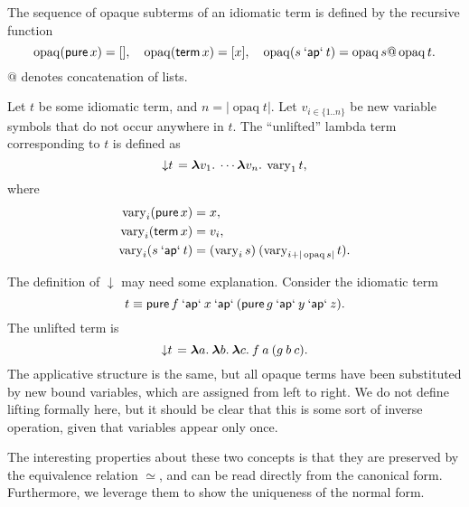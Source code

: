 \begin{definition}\label{def:opaque-seq}
The sequence of opaque subterms of an idiomatic term is defined by the
recursive function
\[
	\operatorname{opaq}(\operatorname{\mathsf{pure}} x) = [], \quad
	\operatorname{opaq}(\operatorname{\mathsf{term}} x) = [x], \quad
	\operatorname{opaq}(s \mathbin{\mathsf{`ap`}} t) = \operatorname{opaq} s @ \operatorname{opaq} t.
\]
$@$ denotes concatenation of lists.
\end{definition}

\begin{definition}[Unlifting]\label{def:unlifting}
Let $t$ be some idiomatic term, and $n = |\operatorname{opaq} t|$.
Let $v_{i \in \{1..n\}}$ be new variable symbols that do not occur anywhere in
$t$.
The ``unlifted'' lambda term corresponding to $t$ is defined as
\[ \left\downarrow t\right. = {\boldsymbol\lambda} v_1.\>\cdots {\boldsymbol\lambda} v_n.\>\operatorname{vary}_1 t, \]
where
\begin{align}
	\operatorname{vary}_i (\operatorname{\mathsf{pure}} x) &= x, \\
	\operatorname{vary}_i (\operatorname{\mathsf{term}} x) &= v_i, \\
	\operatorname{vary}_i (s \mathbin{\mathsf{`ap`}} t) &=
		(\operatorname{vary}_i s) \> (\operatorname{vary}_{i + |\operatorname{opaq} s|} t).
\end{align}
\end{definition}

\begin{example}\label{exmp:unlift}
The definition of $\downarrow$ may need some explanation.
Consider the idiomatic term
\[ t \equiv \operatorname{\mathsf{pure}}{f} \mathbin{\mathsf{`ap`}} x \mathbin{\mathsf{`ap`}} (\operatorname{\mathsf{pure}}{g} \mathbin{\mathsf{`ap`}} y \mathbin{\mathsf{`ap`}} z). \]
The unlifted term is
\[ \left\downarrow t\right. = {\boldsymbol\lambda} a.\>{\boldsymbol\lambda} b.\>{\boldsymbol\lambda} c.\>f \> a \> (g \> b \> c). \]
The applicative structure is the same, but all opaque terms have been
substituted by new bound variables, which are assigned from left to right.
We do not define lifting formally here, but it should be clear that this is
some sort of inverse operation, given that variables appear only once.
\end{example}

The interesting properties about these two concepts is that they are preserved
by the equivalence relation $\simeq$, and can be read directly from the
canonical form.
Furthermore, we leverage them to show the uniqueness of the normal form.

